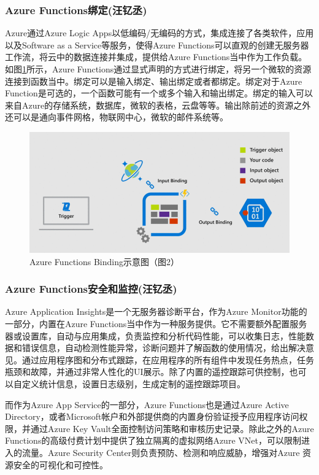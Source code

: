 \documentclass[11pt]{article}
\begin{document}
\subsubsection{Azure Functions绑定(汪钇丞)}
Azure通过Azure Logic Apps以低编码/无编码的方式，集成连接了各类软件，应用以及Software as a Service等服务，使得Azure Functions可以直观的创建无服务器工作流，将云中的数据连接并集成，提供给Azure Functions当中作为工作负载。如图\ref{figs:bind}所示，Azure Functions通过显式声明的方式进行绑定，将另一个微软的资源连接到函数当中。绑定可以是输入绑定、输出绑定或者都绑定。绑定对于Azure Function是可选的，一个函数可能有一个或多个输入和输出绑定。绑定的输入可以来自Azure的存储系统，数据库，微软的表格，云盘等等。输出除前述的资源之外还可以是通向事件网格，物联网中心，微软的邮件系统等。
\begin{figure}[!htbp]
	\centering
	\includegraphics[scale=0.5]{figs/AzureBindings.png}
	\caption{Azure Functions Binding示意图（\cite{binding}图2）}
	\label{figs:bind}
\end{figure}
\subsubsection{Azure Functions安全和监控(汪钇丞)}
Azure Application Insights是一个无服务器诊断平台，作为Azure Monitor功能的一部分，内置在Azure Functions当中作为一种服务提供。它不需要额外配置服务器或设置库，自动与应用集成，负责监控和分析代码性能，可以收集日志，性能数据和错误信息，自动检测性能异常，诊断问题并了解函数的使用情况，给出解决意见。通过应用程序图和分布式跟踪，在应用程序的所有组件中发现任务热点，任务瓶颈和故障，并通过非常人性化的UI展示。除了内置的遥控跟踪可供控制，也可以自定义统计信息，设置日志级别，生成定制的遥控跟踪项目。

而作为Azure App Service的一部分，Azure Functions也是通过Azure Active Directory，或者Microsoft帐户和外部提供商的内置身份验证授予应用程序访问权限，并通过Azure Key Vault全面控制访问策略和审核历史记录。除此之外的Azure Functions的高级付费计划中提供了独立隔离的虚拟网络Azure VNet，可以限制进入的流量。Azure Security Center则负责预防、检测和响应威胁，增强对Azure 资源安全的可视化和可控性。
\end{document}
